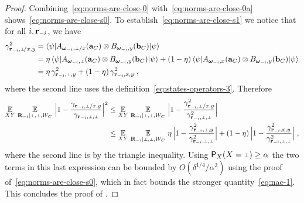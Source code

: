 \begin{proof}
Combining~\eqref{eq:norms-are-close-0} with~\eqref{eq:norms-are-close-0a} shows~\eqref{eq:norms-are-close-s0}. To establish~\eqref{eq:norms-are-close-s1} we notice that for all $i, \mathbf{r}_{-i}$, we have
\begin{align*}
	\gamma_\sspxy^2 &= \bra{\psi} A_{\bomega_\mi,\dummy/x}(\ba_C) \otimes B_{\bomega_\mi,y}(\bb_C) \ket{\psi} \\
	&= \eta \, \bra{\psi} A_{\bomega_\mi,\dummy}(\ba_C) \otimes B_{\bomega_\mi,y}(\bb_C) \ket{\psi} + (1 - \eta) \, \bra{\psi} A_{\bomega_\mi,x}(\ba_C) \otimes B_{\bomega_\mi,y}(\bb_C) \ket{\psi} \\
	&= \eta \, \gamma_\sspy^2 + (1 - \eta) \,\gamma_\ssxy^2\;,
\end{align*}
where the second line uses the definition~\eqref{eq:states-operators-3}. 
Therefore
\begin{align*}
\Ex_{XY} \, \Ex_{\bR_\mi | \dummy, \dummy, W_C} \, \Big | 1 - \frac{\gamma_{\br_\mi, \dummy/x,y}}{\gamma_{\br_\mi,\dummy,\dummy}} \Big |^2 &\leq \Ex_{XY} \, \Ex_{\bR_\mi | \dummy, \dummy, W_C} \, \Big | 1 - \frac{\gamma_{\br_\mi, \dummy/x,y}^2}{\gamma_{\br_\mi,\dummy,\dummy}^2} \Big | \\
&\leq \Ex_{XY} \, \Ex_{\bR_\mi | \dummy, \dummy, W_C} \, \eta \,\Big | 1 - \frac{\gamma_{\br_\mi, \dummy ,y}^2}{\gamma_{\br_\mi,\dummy,\dummy}^2} \Big |+(1 - \eta)\,\Big | 1 - \frac{\gamma_{\br_\mi, x,y}^2}{\gamma_{\br_\mi,\dummy,\dummy}^2} \Big |\;,
\end{align*}
where the second line is by the triangle inequality. 
Using $\P_X(X = \dummy) \geq \alpha$ the two terms in this last expression can be bounded by $O(\delta^{1/4}/\alpha^3)$ using the proof of~\eqref{eq:norms-are-close-s0}, which in fact bounds the stronger quantity~\eqref{eq:nac-1}. This concludes the proof of . 

\end{proof}


